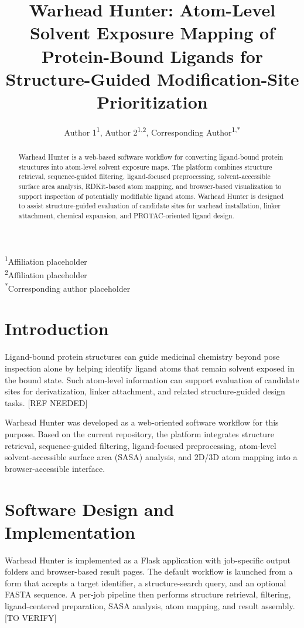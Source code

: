 \documentclass[11pt]{article}
\title{Warhead Hunter: Atom-Level Solvent Exposure Mapping of Protein-Bound Ligands for Structure-Guided Modification-Site Prioritization}
\author{
Author 1\textsuperscript{1},
Author 2\textsuperscript{1,2},
Corresponding Author\textsuperscript{1,*}
}
\date{}
\begin{document}
\maketitle

\noindent
\textsuperscript{1}Affiliation placeholder\\
\textsuperscript{2}Affiliation placeholder\\
\textsuperscript{*}Corresponding author placeholder

\begin{abstract}
Warhead Hunter is a web-based software workflow for converting ligand-bound protein structures into atom-level solvent exposure maps. The platform combines structure retrieval, sequence-guided filtering, ligand-focused preprocessing, solvent-accessible surface area analysis, RDKit-based atom mapping, and browser-based visualization to support inspection of potentially modifiable ligand atoms. Warhead Hunter is designed to assist structure-guided evaluation of candidate sites for warhead installation, linker attachment, chemical expansion, and PROTAC-oriented ligand design.
\end{abstract}

\section{Introduction}
Ligand-bound protein structures can guide medicinal chemistry beyond pose inspection alone by helping identify ligand atoms that remain solvent exposed in the bound state. Such atom-level information can support evaluation of candidate sites for derivatization, linker attachment, and related structure-guided design tasks. [REF NEEDED]

Warhead Hunter was developed as a web-oriented software workflow for this purpose. Based on the current repository, the platform integrates structure retrieval, sequence-guided filtering, ligand-focused preprocessing, atom-level solvent-accessible surface area (SASA) analysis, and 2D/3D atom mapping into a browser-accessible interface.

\section{Software Design and Implementation}
Warhead Hunter is implemented as a Flask application with job-specific output folders and browser-based result pages. The default workflow is launched from a form that accepts a target identifier, a structure-search query, and an optional FASTA sequence. A per-job pipeline then performs structure retrieval, filtering, ligand-centered preparation, SASA analysis, atom mapping, and result assembly. [TO VERIFY]
\end{document}
